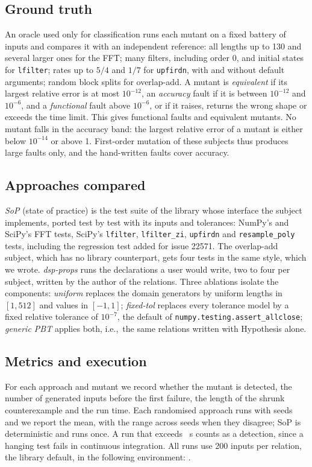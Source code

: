 \documentclass[10pt,conference]{IEEEtran}
\newcommand{\code}[1]{\texttt{#1}}
\newcommand{\ie}{i.e.,\ }
\begin{document}
\subsection{Ground truth}
\label{sec:groundtruth}
An oracle used only for classification runs each mutant on a fixed battery of
inputs and compares it with an independent reference: all lengths up to 130
and several larger ones for the FFT; many filters, including order 0, and
initial states for \code{lfilter}; rates up to $5/4$ and $1/7$ for
\code{upfirdn}, with and without default arguments; random block splits for
overlap-add. A mutant is \emph{equivalent} if its largest relative error is at
most $10^{-12}$, an \emph{accuracy} fault if it is between $10^{-12}$ and
$10^{-6}$, and a \emph{functional} fault above $10^{-6}$, or if it raises,
returns the wrong shape or exceeds the time limit. This gives \nFunctional{}
functional faults and \nEquivalent{} equivalent mutants. No mutant falls in the
accuracy band: the largest relative error of a mutant is either below
$10^{-14}$ or above 1. First-order mutation of these subjects thus produces
large faults only, and the hand-written faults cover accuracy.

\subsection{Approaches compared}
\emph{SoP} (state of practice) is the test suite of the library whose
interface the subject implements, ported test by test with its inputs and
tolerances: NumPy's and SciPy's FFT tests, SciPy's \code{lfilter},
\code{lfilter\_zi}, \code{upfirdn} and \code{resample\_poly} tests, including
the regression test added for issue 22571. The overlap-add subject, which has no
library counterpart, gets four tests in the same style, which we wrote.
\emph{dsp-props} runs the declarations a user would write, two to four per
subject, written by the author of the relations. Three ablations isolate the components: \emph{uniform}
replaces the domain generators by uniform lengths in $[1,512]$ and values in
$[-1,1]$; \emph{fixed-tol} replaces every tolerance model by a fixed relative
tolerance of $10^{-7}$, the default of \code{numpy.testing.assert\_allclose};
\emph{generic PBT} applies both, \ie the same relations written with Hypothesis
alone.

\subsection{Metrics and execution}
For each approach and mutant we record whether the mutant is detected, the
number of generated inputs before the first failure, the length of the shrunk
counterexample and the run time. Each randomised approach runs with \nSeeds{}
seeds and we report the mean, with the range across seeds when they disagree;
SoP is deterministic and runs once. A run that exceeds \timeoutSeconds{}~s
counts as a detection, since a hanging test fails in continuous integration.
All runs use 200 inputs per relation, the library default, in the following
environment: \envDescription.
\end{document}
